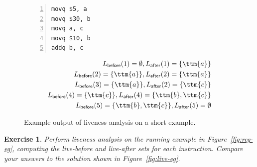 \documentclass[7x10,nocrop]{TimesAPriori_MIT}%
\newtheorem{exercise}[theorem]{Exercise}
\begin{document}
\begin{figure}[tbp]
\begin{minipage}{0.45\textwidth}
\begin{lstlisting}[numbers=left,numberstyle=\tiny]
movq $5, a
movq $30, b
movq a, c
movq $10, b
addq b, c
\end{lstlisting}
\end{minipage}
\vrule\hspace{10pt}
\begin{minipage}{0.45\textwidth}
\begin{align*}
L_{\mathsf{before}}(1)=  \emptyset, 
L_{\mathsf{after}}(1)=  \{\ttm{a}\}\\
L_{\mathsf{before}}(2)=  \{\ttm{a}\},
L_{\mathsf{after}}(2)=  \{\ttm{a}\}\\
L_{\mathsf{before}}(3)=  \{\ttm{a}\},
L_{\mathsf{after}}(2)=  \{\ttm{c}\}\\
L_{\mathsf{before}}(4)=  \{\ttm{c}\},
L_{\mathsf{after}}(4)=  \{\ttm{b},\ttm{c}\}\\
L_{\mathsf{before}}(5)=  \{\ttm{b},\ttm{c}\},
L_{\mathsf{after}}(5)=  \emptyset
\end{align*}
\end{minipage}
\caption{Example output of liveness analysis on a short example.}
\label{fig:liveness-example-0}
\end{figure}

\begin{exercise}\normalfont
  Perform liveness analysis on the running example in
  Figure~\ref{fig:reg-eg}, computing the live-before and live-after
  sets for each instruction. Compare your answers to the solution
  shown in Figure~\ref{fig:live-eg}.
\end{exercise}
\end{document}
